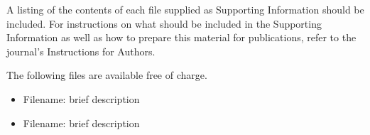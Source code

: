 \documentclass[journal=jacsat,manuscript=communication]{achemso}
\begin{document}
\begin{suppinfo}

A listing of the contents of each file supplied as Supporting Information
should be included. For instructions on what should be included in the
Supporting Information as well as how to prepare this material for
publications, refer to the journal's Instructions for Authors.

The following files are available free of charge.
\begin{itemize}
  \item Filename: brief description
  \item Filename: brief description
\end{itemize}

\end{suppinfo}


\end{document}
